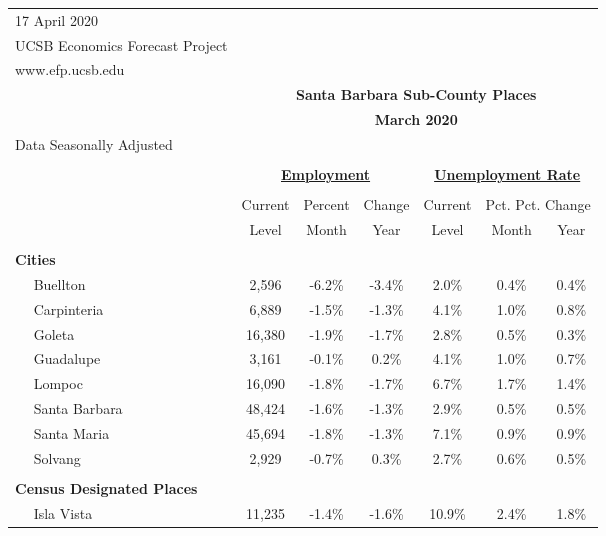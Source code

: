 \documentclass[12pt]{article}
\begin{document}
\begin{landscape}
\begin{table}
\begin{tabular}{|l|c|c|c||c|c|c|}
\multicolumn{1}{l}{\small 17 April 2020} & \multicolumn{6}{c}{} \\
\multicolumn{1}{l}{\small UCSB Economics Forecast Project} & \multicolumn{6}{c}{} \\
\multicolumn{1}{l}{\small www.efp.ucsb.edu} & \multicolumn{6}{c}{} \\
\multicolumn{1}{c}{} & \multicolumn{6}{c}{\large \textbf{Santa Barbara Sub-County Places}} \\
\multicolumn{1}{c}{} & \multicolumn{6}{c}{\large \textbf{March 2020}} \\
\multicolumn{7}{l}{\small Data Seasonally Adjusted} \\ \hline \hline
& \multicolumn{5}{c}{} & \\
& \multicolumn{3}{c}{\textbf{\underline{Employment}} } & \multicolumn{3}{c}{\textbf{\underline{Unemployment Rate}} } \vline \\
& \multicolumn{2}{c}{} & & \multicolumn{2}{c}{} & \\
& Current & \multicolumn{1}{r}{Percent} & Change & Current & \multicolumn{2}{c}{Pct. Pct. Change} \vline \\
& Level & Month & Year & Level & Month & Year \\ \hline
&&&&&& \\
\textbf{Cities} &&&&&& \\
$\quad$ Buellton & 2,596 & -6.2\% & -3.4\% & 2.0\% & 0.4\% & 0.4\% \\
$\quad$ Carpinteria & 6,889 & -1.5\% & -1.3\% & 4.1\% & 1.0\% & 0.8\% \\
$\quad$ Goleta & 16,380 & -1.9\% & -1.7\% & 2.8\% & 0.5\% & 0.3\% \\
$\quad$ Guadalupe & 3,161 & -0.1\% & 0.2\% & 4.1\% & 1.0\% & 0.7\% \\
$\quad$ Lompoc & 16,090 & -1.8\% & -1.7\% & 6.7\% & 1.7\% & 1.4\% \\
$\quad$ Santa Barbara & 48,424 & -1.6\% & -1.3\% & 2.9\% & 0.5\% & 0.5\% \\
$\quad$ Santa Maria & 45,694 & -1.8\% & -1.3\% & 7.1\% & 0.9\% & 0.9\% \\
$\quad$ Solvang & 2,929 & -0.7\% & 0.3\% & 2.7\% & 0.6\% & 0.5\% \\
&&&&&& \\
\textbf{Census Designated Places} &&&&&& \\
$\quad$ Isla Vista & 11,235 & -1.4\% & -1.6\% & 10.9\% & 2.4\% & 1.8\% \\

\end{tabular}
\end{table}
\end{landscape}
\end{document}
